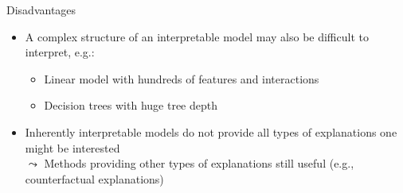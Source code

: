 \documentclass[11pt,compress,t,notes=noshow, aspectratio=169, xcolor=table]{beamer}
\begin{document}
\begin{frame}{Disadvantages}
\begin{itemize}
\itemsep1em
    \item<3-> A complex structure of an interpretable model may also be difficult to interpret, e.g.:
    \begin{itemize}
        \item Linear model with hundreds of features and interactions 
        \item Decision trees with huge tree depth
    \end{itemize}
     \item<4-> Inherently interpretable models do not provide all types of explanations one might be interested\\
     $\leadsto$ Methods providing other types of explanations still useful (e.g., counterfactual explanations)
\end{itemize}
\end{frame}
\end{document}
